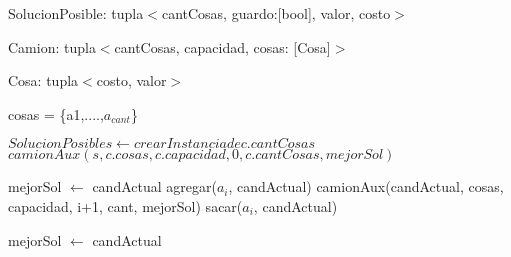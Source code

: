 SolucionPosible: tupla$<$cantCosas, guardo:[bool], valor, costo$>$

Camion: tupla$<$cantCosas, capacidad, cosas: [Cosa]$>$

Cosa: tupla$<$costo, valor$>$

cosas = \{a1,....,$a_{cant}$\}

\begin{algorithm}
\begin{algorithmic}[1]
    \STATE $SolucionPosible s \leftarrow crear Instancia de c.cantCosas$
    \STATE $camionAux(s, c.cosas, c.capacidad, 0, c.cantCosas, mejorSol)$
\end{algorithmic}
\end{algorithm}

\medskip
\begin{algorithm}
\begin{algorithmic}[1]
        \STATE mejorSol $\leftarrow$ candActual
    \ELSE
                    \STATE agregar($a_i$, candActual)
                    \STATE camionAux(candActual, cosas, capacidad, i+1, cant, mejorSol)
                    \STATE sacar($a_i$, candActual)
                \ENDIF
            \ENDFOR

                \STATE mejorSol $\leftarrow$ candActual
            \ENDIF
        \ENDIF
    \ENDIF
\end{algorithmic}
\end{algorithm}